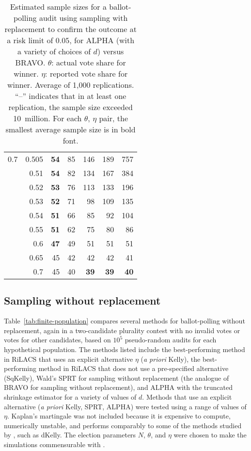 \documentclass[12pt,runningheads]{llncs}
\begin{document}
{\begin{table}
\begin{tabular}{lr|rrrr|r}
\hline
0.7 & 0.505 & \bf{54} & 85 & 146 & 189 & 757 \\
     & 0.51 & \bf{54} & 82 & 134 & 167 & 384 \\
     & 0.52 & \bf{53} & 76 & 113 & 133 & 196 \\
     & 0.53 & \bf{52} & 71 & 98 & 109 & 135 \\
     & 0.54 & \bf{51} & 66 & 85 & 92 & 104 \\
     & 0.55 & \bf{51} & 62 & 75 & 80 & 86 \\
     & 0.6 & \bf{47} & 49 & 51 & 51 & 51 \\
     & 0.65 & 45 & 42 & 42 & 42 & 41 \\
     & 0.7 & 45 & 40 & \bf{39} & \bf{39} & \bf{40} 
\end{tabular}
\caption{\protect \label{tab:results} Estimated sample sizes for a ballot-polling audit using sampling with replacement
to confirm the outcome at a risk limit of $0.05$, for ALPHA (with a variety of choices of
$d$) versus BRAVO.
$\theta$: actual vote share for winner.
$\eta$: reported vote share for winner.
Average of 1,000 replications.
``--'' indicates that in at least one replication, the sample size exceeded 10~million.
For each $\theta$, $\eta$ pair, the smallest average sample size is in bold font.
}
\end{table}

\subsection{Sampling without replacement}
Table~\ref{tab:finite-population} compares several methods for ballot-polling without replacement, again in a two-candidate
plurality contest with no invalid votes or votes for other candidates, based on $10^5$ pseudo-random audits
for each hypothetical population.
The methods listed include the best-performing method in RiLACS \cite{waudby-smithEtal21} 
that uses an explicit alternative $\eta$ (\emph{a priori} Kelly), the best-performing method in RiLACS
that does not use a pre-specified alternative (SqKelly), 
Wald's SPRT for sampling without replacement (the analogue of BRAVO for sampling without replacement), and
ALPHA with the truncated shrinkage estimator for a variety of values of
$d$. 
Methods that use an explicit alternative (\emph{a priori} Kelly, SPRT, ALPHA) were tested using a range of values of $\eta$.
Kaplan's martingale \cite{stark20} was not included because it is expensive to compute, numerically unstable, and
performs comparably to some of the methods studied by \cite{waudby-smithEtal21}, such as dKelly.
The election parameters $N$, $\theta$, and $\eta$ were chosen to make the simulations commensurable with \cite{huangEtal20}.

}
\end{document}
